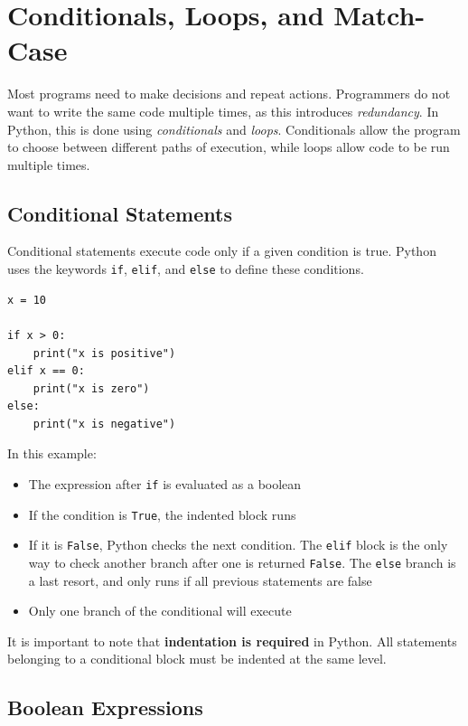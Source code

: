 \section{Conditionals, Loops, and Match-Case}
Most programs need to make decisions and repeat actions. Programmers do not want to write the same code multiple times, as this introduces \textit{redundancy}. In Python, this is done using \emph{conditionals} and \emph{loops}. Conditionals allow the program to
choose between different paths of execution, while loops allow code to be run
multiple times.

\subsection{Conditional Statements}

Conditional statements execute code only if a given condition is true. Python
uses the keywords \texttt{if}, \texttt{elif}, and \texttt{else} to define these
conditions.

\begin{verbatim}
x = 10

if x > 0:
    print("x is positive")
elif x == 0:
    print("x is zero")
else:
    print("x is negative")
\end{verbatim}

In this example:
\begin{itemize}
    \item The expression after \texttt{if} is evaluated as a boolean
    \item If the condition is \texttt{True}, the indented block runs
    \item If it is \texttt{False}, Python checks the next condition. The \texttt{elif} block is the only way to check another branch after one is returned \texttt{False}. The \texttt{else} branch is a last resort, and only runs if all previous statements are false
    \item Only one branch of the conditional will execute
\end{itemize}

It is important to note that \textbf{indentation is required} in Python. All
statements belonging to a conditional block must be indented at the same level.

\subsection{Boolean Expressions}

